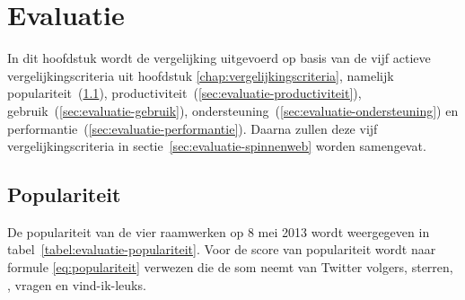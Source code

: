 \chapter{Evaluatie}
\label{chap:evaluatie}

In dit hoofdstuk wordt de vergelijking uitgevoerd op basis van de vijf actieve vergelijkingscriteria uit hoofdstuk \ref{chap:vergelijkingscriteria}, namelijk populariteit~(\ref{sec:evaluatie-populariteit}), productiviteit~(\ref{sec:evaluatie-productiviteit}), gebruik~(\ref{sec:evaluatie-gebruik}), ondersteuning~(\ref{sec:evaluatie-ondersteuning}) en performantie~(\ref{sec:evaluatie-performantie}). 
Daarna zullen deze vijf vergelijkingscriteria in sectie~\ref{sec:evaluatie-spinnenweb} worden samengevat.


\section{Populariteit} %
\label{sec:evaluatie-populariteit}

De populariteit van de vier raamwerken op 8 mei 2013 wordt weergegeven in tabel~\ref{tabel:evaluatie-populariteit}. 
Voor de score van populariteit wordt naar formule \ref{eq:populariteit} verwezen die de som neemt van Twitter volgers, \gh{} sterren, \gh{} , \so{} vragen en \fb{} vind-ik-leuks.

\begin{table}
\centering
{}
\caption{Overzicht van populariteit op 8 mei 2013.}
\label{tabel:evaluatie-populariteit}
\end{table}

